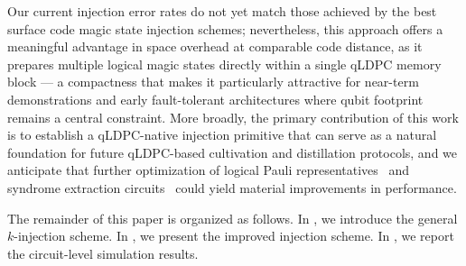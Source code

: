 Our current injection error rates do not yet match those achieved by the best surface code magic state injection schemes; nevertheless, this approach offers a meaningful advantage in space overhead at comparable code distance, as it prepares multiple logical magic states directly within a single qLDPC memory block — a compactness that makes it particularly attractive for near-term demonstrations and early fault-tolerant architectures where qubit footprint remains a central constraint. More broadly, the primary contribution of this work is to establish a qLDPC-native injection primitive that can serve as a natural foundation for future qLDPC-based cultivation and distillation protocols, and we anticipate that further optimization of logical Pauli representatives~\cite{cross_improved_2024,yoder_tour_2025} and syndrome extraction circuits~\cite{gidney_cleaner_2023,lao_magic_2022,singh_high-fidelity_2022} could yield material improvements in performance.

The remainder of this paper is organized as follows.
In , we introduce the general $k$-injection scheme.
In , we present the improved injection scheme.
In , we report the circuit-level simulation results.
